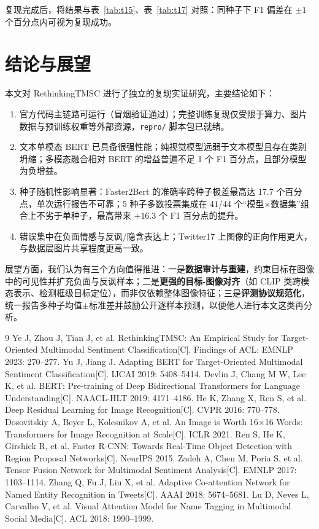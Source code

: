 \documentclass[11pt]{ctexart}
\begin{document}
复现完成后，将结果与表~\ref{tab:t15}、表~\ref{tab:t17} 对照：同种子下 F1 偏差在 $\pm 1$ 个百分点内可视为复现成功。

\section{结论与展望}

本文对 RethinkingTMSC 进行了独立的复现实证研究，主要结论如下：
\begin{enumerate}
  \item 官方代码主链路可运行（冒烟验证通过）；完整训练复现仅受限于算力、图片数据与预训练权重等外部资源，\texttt{repro/} 脚本包已就绪。
  \item 文本单模态 BERT 已具备很强性能；纯视觉模型远弱于文本模型且存在类别坍缩；多模态融合相对 BERT 的增益普遍不足 1 个 F1 百分点，且部分模型为负增益。
  \item 种子随机性影响显著：Faster2Bert 的准确率跨种子极差最高达 17.7 个百分点，单次运行报告不可靠；5 种子多数投票集成在 41/44 个“模型$\times$数据集”组合上不劣于单种子，最高带来 $+16.3$ 个 F1 百分点的提升。
  \item 错误集中在负面情感与反讽/隐含表达上；Twitter17 上图像的正向作用更大，与数据层图片共享程度更高一致。
\end{enumerate}

展望方面，我们认为有三个方向值得推进：一是\textbf{数据审计与重建}，约束目标在图像中的可见性并扩充负面与反讽样本；二是\textbf{更强的目标-图像对齐}（如 CLIP 类跨模态表示、检测框级目标定位），而非仅依赖整体图像特征；三是\textbf{评测协议规范化}，统一报告多种子均值$\pm$标准差并鼓励公开逐样本预测，以便他人进行本文这类再分析。

\begin{thebibliography}{9}
 Ye J, Zhou J, Tian J, et al. RethinkingTMSC: An Empirical Study for Target-Oriented Multimodal Sentiment Classification[C]. Findings of ACL: EMNLP 2023: 270--277.
 Yu J, Jiang J. Adapting BERT for Target-Oriented Multimodal Sentiment Classification[C]. IJCAI 2019: 5408--5414.
 Devlin J, Chang M W, Lee K, et al. BERT: Pre-training of Deep Bidirectional Transformers for Language Understanding[C]. NAACL-HLT 2019: 4171--4186.
 He K, Zhang X, Ren S, et al. Deep Residual Learning for Image Recognition[C]. CVPR 2016: 770--778.
 Dosovitskiy A, Beyer L, Kolesnikov A, et al. An Image is Worth 16$\times$16 Words: Transformers for Image Recognition at Scale[C]. ICLR 2021.
 Ren S, He K, Girshick R, et al. Faster R-CNN: Towards Real-Time Object Detection with Region Proposal Networks[C]. NeurIPS 2015.
 Zadeh A, Chen M, Poria S, et al. Tensor Fusion Network for Multimodal Sentiment Analysis[C]. EMNLP 2017: 1103--1114.
 Zhang Q, Fu J, Liu X, et al. Adaptive Co-attention Network for Named Entity Recognition in Tweets[C]. AAAI 2018: 5674--5681.
 Lu D, Neves L, Carvalho V, et al. Visual Attention Model for Name Tagging in Multimodal Social Media[C]. ACL 2018: 1990--1999.
\end{thebibliography}
\end{document}
